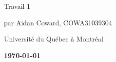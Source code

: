 \documentclass[12pt, letterpaper]{article}
\begin{document}
\begin{titlepage}
	\begin{center}



Travail 1 

par Aidan Coward, COWA31039304

Université du Québec à Montréal

\vfill
\textbf{\today}

	\end{center}
\end{titlepage}

\begin{center}
\end{center}
\end{document}
